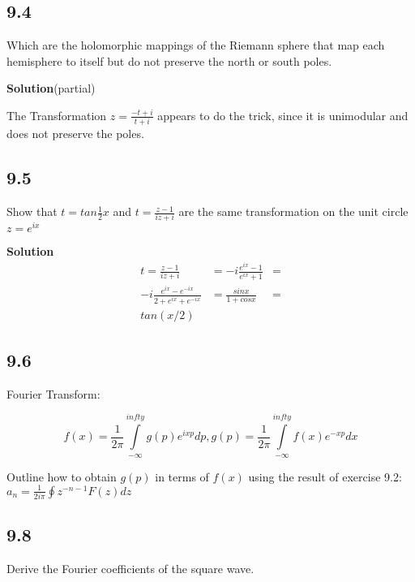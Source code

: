\documentclass[]{article}
\begin{document}
\subsection*{9.4}
Which are the holomorphic mappings of the Riemann sphere that map each hemisphere to itself but do not preserve the north or south poles.

\textbf{Solution}(partial)

The Transformation $z = \frac{-t+i}{t+i}$ appears to do the trick, since it is unimodular and does not preserve the poles. 

\subsection*{9.5}
Show that $t = tan\frac{1}{2}x$ and $t = \frac{z-1}{iz+i}$ are the same transformation
on the unit circle $z = e^{ix}$

\textbf{Solution}
\begin{eqnarray}
t = \frac{z-1}{iz+i} &= -i\frac{e^{ix}-1}{e^{ix}+1} &= \\
-i\frac{e^{ix}-e^{-ix}}{2+e^{ix}+e^{-ix}} &= \frac{sinx}{1+cosx} &= \\
tan(x/2)
\end{eqnarray}

\subsection*{9.6}
Fourier Transform:

$$
f(x) = \frac{1}{2\pi} \int\limits_{-\infty}^{infty} g(p)e^{ixp}dp,
g(p) = \frac{1}{2\pi} \int\limits_{-\infty}^{infty} f(x)e^{-xp}dx
$$

Outline how to obtain $g(p)$ in terms of $f(x)$ using the result of exercise 9.2: 
$a_n = \frac{1}{2i\pi}\oint z^{-n-1}F(z)dz$

\subsection*{9.8}
Derive the Fourier coefficients of the square wave. 
\end{document}
